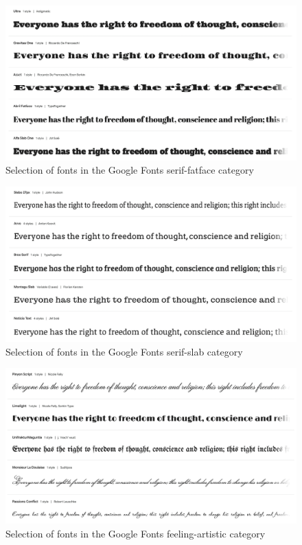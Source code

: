 \begin{figure}[]
    \centering
    \includegraphics[width=\textwidth]{images/serif-fatface.png}
    \caption{Selection of fonts in the Google Fonts serif-fatface category}
    \label{fig:serif-fatface}
\end{figure}

\begin{figure}[]
    \centering
    \includegraphics[width=\textwidth]{images/serif-slab.png}
    \caption{Selection of fonts in the Google Fonts serif-slab category}
    \label{fig:serif-slab}
\end{figure}

\begin{figure}[]
    \centering
    \includegraphics[width=\textwidth]{images/feeling-artistic.png}
    \caption{Selection of fonts in the Google Fonts feeling-artistic category}
    \label{fig:feeling-artistic}
\end{figure}


